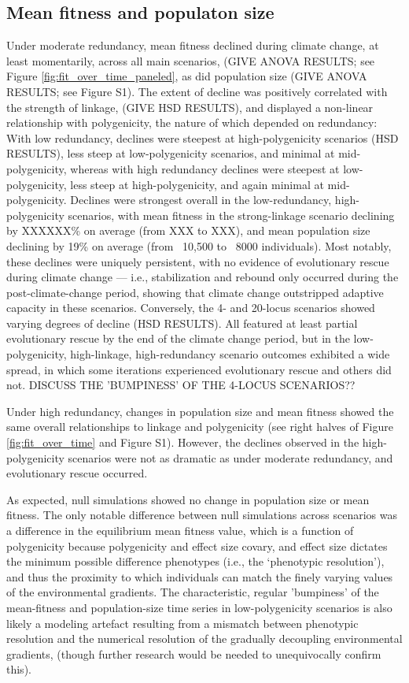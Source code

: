 \documentclass[9pt,twocolumn,twoside,lineno]{pnas-new}
\begin{document}
\subsection*{Mean fitness and populaton size}
Under moderate redundancy, mean fitness declined during climate change, at least momentarily, across all main scenarios, (GIVE ANOVA 
RESULTS; see Figure \ref{fig:fit_over_time_paneled}, as did population size (GIVE ANOVA 
RESULTS; see Figure S1). The extent of decline was 
positively correlated with the strength of linkage, (GIVE HSD RESULTS), and 
displayed a non-linear relationship with polygenicity, the nature of which depended on redundancy:
With low redundancy, declines were steepest at high-polygenicity
scenarios (HSD RESULTS), less steep at low-polygenicity scenarios, and minimal at
mid-polygenicity, whereas with high redundancy declines were steepest at
low-polygenicity, less steep at high-polygenicity, and again minimal at mid-polygenicity.
Declines were strongest overall in the low-redundancy, high-polygenicity scenarios,
with mean fitness in the strong-linkage scenario 
declining by XXXXXX\% on average (from XXX to XXX),
and mean population size declining by 19\% on average (from ~10,500 to ~8000 individuals).
Most notably, these declines were uniquely persistent,
with no evidence of evolutionary rescue during climate change --- i.e., stabilization and rebound only occurred during the post-climate-change period,  showing that climate change outstripped adaptive capacity in these scenarios.
Conversely, the 4- and 20-locus scenarios showed varying degrees
of decline (HSD RESULTS).
All featured at least partial evolutionary rescue by the end of the climate change period,
but in the low-polygenicity, high-linkage, high-redundancy scenario outcomes exhibited
a wide spread, in which some iterations experienced evolutionary rescue and others did not.
 DISCUSS THE 'BUMPINESS' OF THE 4-LOCUS SCENARIOS?? 

Under high redundancy, changes in population size and mean fitness showed
the same overall relationships to linkage and polygenicity (see right halves of Figure \ref{fig:fit_over_time} and Figure S1).
However, the declines observed in the high-polygenicity scenarios were not as dramatic as
under moderate redundancy, and evolutionary rescue occurred.

As expected, null simulations showed no change in population size or mean fitness.
The only notable difference between null simulations across scenarios was a difference in the 
equilibrium mean fitness value, which is a function of polygenicity because polygenicity 
and effect size covary, and effect size dictates the minimum possible difference phenotypes
(i.e., the `phenotypic resolution'), and thus the proximity to which individuals can 
match the finely varying values of the environmental gradients.
The characteristic, regular 'bumpiness' of the mean-fitness and population-size
time series in low-polygenicity scenarios is also likely a modeling artefact
resulting from a mismatch between phenotypic resolution
and the numerical resolution of the gradually decoupling environmental gradients,
(though further research would be needed to unequivocally confirm this).
\end{document}
